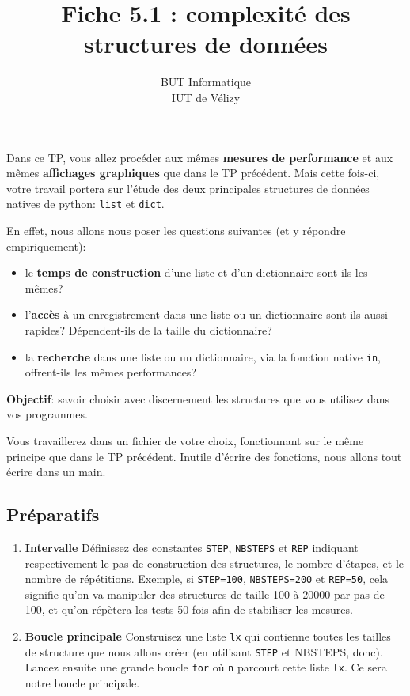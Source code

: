 \documentclass[11pt,a4paper]{article}
\title{Fiche 5.1 : complexité des structures de données}
\author{BUT Informatique\\
IUT de Vélizy\\
}
\date{}
\newcommand{\checkbox}{$\square$ \smallskip}
\newcounter{exo} \setcounter{exo}{0}
\newenvironment{action}{%
    \begin{enumerate}[\numerotation] \addtocounter{exo}{-1}%
        }{%
    \end{enumerate}
}
\newcommand{\numexoa}{\theexo \addtocounter{exo}{1}}
\newcommand{\numerotation}{\checkbox \smallskip \numexoa.}
\begin{document}
\maketitle





\thispagestyle{empty}

Dans ce TP, vous allez procéder aux mêmes {\bf mesures de performance} et aux mêmes {\bf affichages graphiques} que dans le TP précédent. Mais cette fois-ci, votre travail portera sur l'étude des deux principales structures de données natives de python: {\tt list} et {\tt dict}.\ 

En effet, nous allons nous poser les questions suivantes (et y répondre empiriquement):
\begin{itemize}
  \item le {\bf temps de construction} d'une liste et d'un dictionnaire sont-ils les mêmes?
  \item l'{\bf accès} à un enregistrement dans une liste ou un dictionnaire sont-ils aussi rapides? Dépendent-ils de la taille du dictionnaire?
  \item la {\bf recherche} dans une liste ou un dictionnaire, via la fonction native {\tt in}, offrent-ils les mêmes performances?
\end{itemize}

{\bf Objectif}: savoir choisir avec discernement les structures que vous utilisez dans vos programmes.\ 

Vous travaillerez dans un fichier de votre choix, fonctionnant sur le même principe que dans le TP précédent. Inutile d'écrire des fonctions, nous allons tout écrire dans un main.

\subsection*{Préparatifs}
\begin{action}
\item {\bf Intervalle} Définissez des constantes {\tt STEP}, {\tt NBSTEPS} et {\tt REP} indiquant respectivement le pas de construction des structures, le nombre d'étapes, et le nombre de répétitions. Exemple, si {\tt STEP=100}, {\tt NBSTEPS=200} et {\tt REP=50}, cela signifie qu'on va manipuler des structures de taille 100 à 20000 par pas de 100, et qu'on répètera les tests 50 fois afin de stabiliser les mesures.
\item {\bf Boucle principale} Construisez une liste {\tt lx} qui contienne toutes les tailles de structure que nous allons créer (en utilisant {\tt STEP} et {NBSTEPS}, donc). Lancez ensuite une grande boucle {\tt for} où {\tt n} parcourt cette liste {\tt lx}. Ce sera notre boucle principale.
\end{action}
\end{document}
